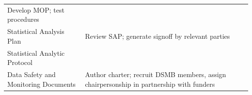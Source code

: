 \documentclass[]{book}
\begin{document}
\begin{longtable}[]{@{}llll@{}}
\begin{minipage}[t]{0.28\columnwidth}
Develop MOP; test procedures\strut
\end{minipage} & \begin{minipage}[t]{0.35\columnwidth}\raggedright\strut
\strut
\end{minipage} & \begin{minipage}[t]{0.17\columnwidth}\raggedright\strut
\strut
\end{minipage}\tabularnewline
\begin{minipage}[t]{0.08\columnwidth}\raggedright\strut
Statistical Analysis Plan\strut
\end{minipage} & \begin{minipage}[t]{0.28\columnwidth}\raggedright\strut
Review SAP; generate signoff by relevant parties\strut
\end{minipage} & \begin{minipage}[t]{0.35\columnwidth}\raggedright\strut
\strut
\end{minipage} & \begin{minipage}[t]{0.17\columnwidth}\raggedright\strut
\strut
\end{minipage}\tabularnewline
\begin{minipage}[t]{0.08\columnwidth}\raggedright\strut
Statistical Analytic Protocol\strut
\end{minipage} & \begin{minipage}[t]{0.28\columnwidth}\raggedright\strut
\strut
\end{minipage} & \begin{minipage}[t]{0.35\columnwidth}\raggedright\strut
\strut
\end{minipage} & \begin{minipage}[t]{0.17\columnwidth}\raggedright\strut
\strut
\end{minipage}\tabularnewline
\begin{minipage}[t]{0.08\columnwidth}\raggedright\strut
Data Safety and Monitoring Documents\strut
\end{minipage} & \begin{minipage}[t]{0.28\columnwidth}\raggedright\strut
Author charter; recruit DSMB members, assign chairpersonship in
partnership with funders\strut
\end{minipage} & \begin{minipage}[t]{0.35\columnwidth}\raggedright\strut
\strut
\end{minipage} & \begin{minipage}[t]{0.17\columnwidth}\raggedright\strut
\strut
\end{minipage}\tabularnewline

\end{longtable}
\end{document}
